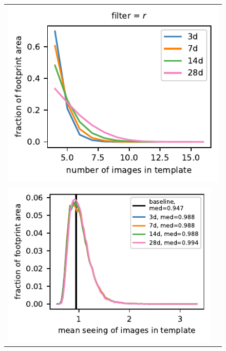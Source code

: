 \documentclass[preprintm,linenumbers]{aastex631}
\begin{document}
		\begin{figure}
			\centering
%				
%				

			\begin{tabular}{@{}c@{}c@{}}
	\multicolumn{2}{c}{	\includegraphics{results/histograms_templates_tscale/hist_first_year_one_snap_v4_0_10yrs_db_noDD_noTwi_doALLTemplateMetrics_reduceNTemplate_r_noDD_noTwi.pdf}} \\
	\includegraphics{results/histograms_templates_tscale/hist_first_year_one_snap_v4_0_10yrs_db_noDD_noTwi_doALLTemplateMetrics_reduceSeeingTemplate_r_noDD_noTwi.pdf} &

\end{tabular}
\end{figure}
\end{document}
